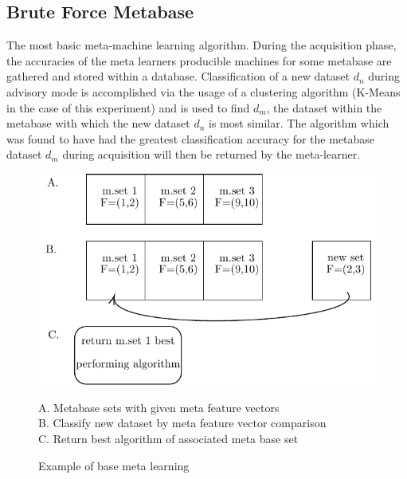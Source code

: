 \subsection{Brute Force Metabase}
The most basic meta-machine learning algorithm. During the acquisition phase,  the
accuracies of the meta learners producible machines for some metabase are gathered
and stored within a database. Classification of a new dataset $d_n$ during advisory
mode is accomplished via the usage of a clustering algorithm (K-Means in the case
of this experiment) and is used to find $d_m$, the dataset within the metabase
with which the new dataset $d_n$ is most similar. The algorithm which was found
to have had the greatest classification accuracy for the metabase dataset $d_m$
during acquisition will then be returned by the meta-learner.
\begin{figure}[h]
\includegraphics{Chapters/Images/BaseLearner/BaseLearner.pdf}
\caption{Example of base meta learning}
\centering
\begin{flushleft}
A. Metabase sets with given meta feature vectors \\
B. Classify new dataset by meta feature vector comparison \\
C. Return best algorithm of associated meta base set
\end{flushleft}
\end{figure}
